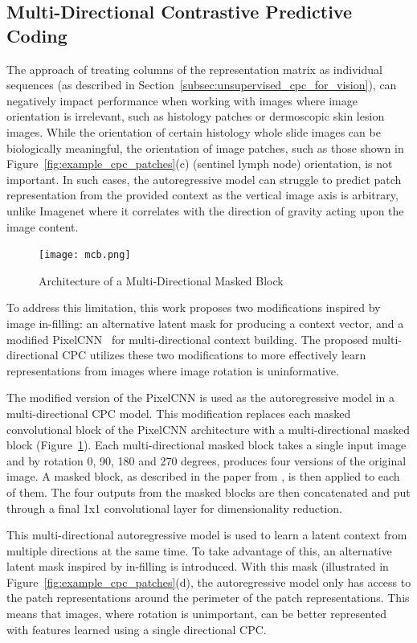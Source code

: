 \subsection{Multi-Directional Contrastive Predictive Coding}
\label{subsec:unsupervised_mdcpc}
The approach of treating columns of the representation matrix as individual sequences (as described in Section~\ref{subsec:unsupervised_cpc_for_vision}), can negatively impact performance when working with images where image orientation is irrelevant, such as histology patches or dermoscopic skin lesion images. While the orientation of certain histology whole slide images can be biologically meaningful, the orientation of image patches, such as those shown in Figure~\ref{fig:example_cpc_patches}(c) (sentinel lymph node) orientation, is not important. In such cases, the autoregressive model can struggle to predict patch representation from the provided context as the vertical image axis is arbitrary, unlike Imagenet where it correlates with the direction of gravity acting upon the image content.

\begin{figure}
	\centering
	\texttt{[image: mcb.png]}
	\caption{Architecture of a Multi-Directional Masked Block}
	\label{fig:multi-directional_masked_block}
\end{figure}

To address this limitation, this work proposes two modifications inspired by image in-filling: an alternative latent mask for producing a context vector, and a modified PixelCNN~\citep{oord2016pixel} for multi-directional context building. The proposed multi-directional CPC utilizes these two modifications to more effectively learn representations from images where image rotation is uninformative.

The modified version of the PixelCNN is used as the autoregressive model in a multi-directional CPC model. This modification replaces each masked convolutional block of the PixelCNN architecture with a multi-directional masked block (Figure~\ref{fig:multi-directional_masked_block}). Each multi-directional masked block takes a single input image and by rotation 0, 90, 180 and 270 degrees, produces four versions of the original image. A masked block, as described in the paper from \cite{oord2016pixel}, is then applied to each of them. The four outputs from the masked blocks are then concatenated and put through a final 1x1 convolutional layer for dimensionality reduction.

This multi-directional autoregressive model is used to learn a latent context from multiple directions at the same time. To take advantage of this, an alternative latent mask inspired by in-filling is introduced. With this mask (illustrated in Figure~\ref{fig:example_cpc_patches}(d), the autoregressive model only has access to the patch representations around the perimeter of the patch representations. This means that images, where rotation is unimportant, can be better represented with features learned using a single directional CPC.



